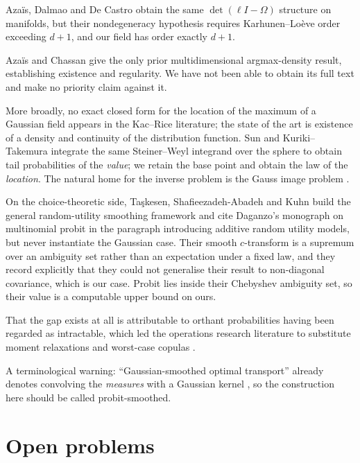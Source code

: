 \documentclass[11pt]{article}
\theoremstyle{definition}
\begin{document}
Aza\"is, Dalmao and De Castro \cite{ADD} obtain the same $\det(\ell I-\Omega)$
structure on manifolds, but their nondegeneracy hypothesis requires
Karhunen--Lo\`eve order exceeding $d+1$, and our field has order exactly
$d+1$.

Aza\"is and Chassan \cite{AzaisChassan} give the only prior multidimensional
argmax-density result, establishing existence and regularity. We have not
been able to obtain its full text and make no priority claim against it.

More broadly, no exact closed form for the location of the maximum of a
Gaussian field appears in the Kac--Rice literature; the state of the art is
existence of a density and continuity of the distribution function. Sun
\cite{Sun} and Kuriki--Takemura \cite{KurikiTakemura} integrate the same
Steiner--Weyl integrand over the sphere to obtain tail probabilities of the
\emph{value}; we retain the base point and obtain the law of the
\emph{location}. The natural home for the inverse problem is the Gauss image
problem \cite{BLYZZ}.

On the choice-theoretic side, Ta\c{s}kesen, Shafieezadeh-Abadeh and Kuhn
\cite{TSK} build the general random-utility smoothing framework and cite
Daganzo's monograph on multinomial probit in the paragraph introducing
additive random utility models, but never instantiate the Gaussian case.
Their smooth $c$-transform is a supremum over an ambiguity set rather than an
expectation under a fixed law, and they record explicitly that they could not
generalise their result to non-diagonal covariance, which is our case. Probit
lies inside their Chebyshev ambiguity set, so their value is a computable
upper bound on ours.

That the gap exists at all is attributable to orthant probabilities having
been regarded as intractable, which led the operations research literature to
substitute moment relaxations and worst-case copulas \cite{NST}.

A terminological warning: ``Gaussian-smoothed optimal transport'' already
denotes convolving the \emph{measures} with a Gaussian kernel \cite{Goldfeld},
so the construction here should be called probit-smoothed.

\section{Open problems}
\end{document}
